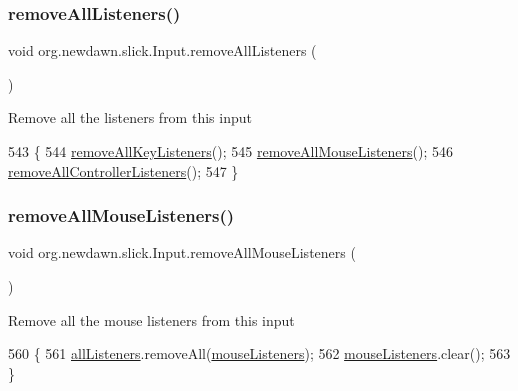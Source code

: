 \subsubsection{\texorpdfstring{remove\+All\+Listeners()}{removeAllListeners()}}
{\footnotesize\ttfamily void org.\+newdawn.\+slick.\+Input.\+remove\+All\+Listeners (\begin{DoxyParamCaption}{ }\end{DoxyParamCaption})\hspace{0.3cm}{\ttfamily [inline]}}

Remove all the listeners from this input 
\begin{DoxyCode}
543                                      \{
544         \mbox{\hyperlink{classorg_1_1newdawn_1_1slick_1_1_input_ae9aa4789e13f1528ae603939684a4237}{removeAllKeyListeners}}();
545         \mbox{\hyperlink{classorg_1_1newdawn_1_1slick_1_1_input_a6dd476ab3012b25cf58781ca9ad61002}{removeAllMouseListeners}}();
546         \mbox{\hyperlink{classorg_1_1newdawn_1_1slick_1_1_input_acb348bdf120c425b0f18baec184196ac}{removeAllControllerListeners}}();
547     \}
\end{DoxyCode}
\mbox{\label{classorg_1_1newdawn_1_1slick_1_1_input_a6dd476ab3012b25cf58781ca9ad61002}} 
\subsubsection{\texorpdfstring{remove\+All\+Mouse\+Listeners()}{removeAllMouseListeners()}}
{\footnotesize\ttfamily void org.\+newdawn.\+slick.\+Input.\+remove\+All\+Mouse\+Listeners (\begin{DoxyParamCaption}{ }\end{DoxyParamCaption})\hspace{0.3cm}{\ttfamily [inline]}}

Remove all the mouse listeners from this input 
\begin{DoxyCode}
560                                           \{
561         \mbox{\hyperlink{classorg_1_1newdawn_1_1slick_1_1_input_a26d5ed77d8b0444118d630336d0ab6d7}{allListeners}}.removeAll(\mbox{\hyperlink{classorg_1_1newdawn_1_1slick_1_1_input_a14f9c58eb48c498073f11c6934d92998}{mouseListeners}});
562         \mbox{\hyperlink{classorg_1_1newdawn_1_1slick_1_1_input_a14f9c58eb48c498073f11c6934d92998}{mouseListeners}}.clear();
563     \}
\end{DoxyCode}
\mbox{\label{classorg_1_1newdawn_1_1slick_1_1_input_acd102385907c4fa71c55aa32c4f22035}} 
